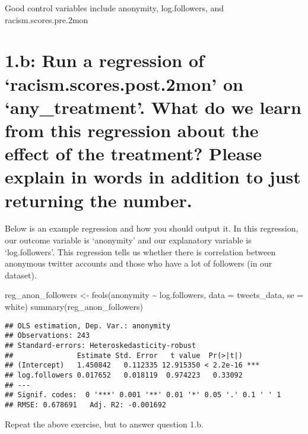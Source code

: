 \documentclass[
]{article}
\newenvironment{Shaded}{\begin{snugshade}}{\end{snugshade}}
\newcommand{\AttributeTok}[1]{\textcolor[rgb]{0.77,0.63,0.00}{#1}}
\newcommand{\FunctionTok}[1]{\textcolor[rgb]{0.00,0.00,0.00}{#1}}
\newcommand{\NormalTok}[1]{#1}
\newcommand{\OtherTok}[1]{\textcolor[rgb]{0.56,0.35,0.01}{#1}}
\newcommand{\SpecialCharTok}[1]{\textcolor[rgb]{0.00,0.00,0.00}{#1}}
\newcommand{\StringTok}[1]{\textcolor[rgb]{0.31,0.60,0.02}{#1}}
\begin{document}
Good control variables include anonymity, log.followers, and
racism.scores.pre.2mon

\hypertarget{b-run-a-regression-of-racism.scores.post.2mon-on-any_treatment.-what-do-we-learn-from-this-regression-about-the-effect-of-the-treatment-please-explain-in-words-in-addition-to-just-returning-the-number.}{%
\section{1.b: Run a regression of `racism.scores.post.2mon' on
`any\_treatment'. What do we learn from this regression about the effect
of the treatment? Please explain in words in addition to just returning
the
number.}\label{b-run-a-regression-of-racism.scores.post.2mon-on-any_treatment.-what-do-we-learn-from-this-regression-about-the-effect-of-the-treatment-please-explain-in-words-in-addition-to-just-returning-the-number.}}

Below is an example regression and how you should output it. In this
regression, our outcome variable is `anonymity' and our explanatory
variable is `log.followers'. This regression tells us whether there is
correlation between anonymous twitter accounts and those who have a lot
of followers (in our dataset).

\begin{Shaded}
\begin{Highlighting}[]
\NormalTok{reg\_anon\_followers }\OtherTok{\textless{}{-}} \FunctionTok{feols}\NormalTok{(anonymity }\SpecialCharTok{\textasciitilde{}}\NormalTok{ log.followers, }\AttributeTok{data =}\NormalTok{ tweets\_data, }\AttributeTok{se =} \StringTok{\textquotesingle{}white\textquotesingle{}}\NormalTok{)}
\FunctionTok{summary}\NormalTok{(reg\_anon\_followers)}
\end{Highlighting}
\end{Shaded}

\begin{verbatim}
## OLS estimation, Dep. Var.: anonymity
## Observations: 243 
## Standard-errors: Heteroskedasticity-robust 
##               Estimate Std. Error   t value  Pr(>|t|)    
## (Intercept)   1.450842   0.112335 12.915350 < 2.2e-16 ***
## log.followers 0.017652   0.018119  0.974223   0.33092    
## ---
## Signif. codes:  0 '***' 0.001 '**' 0.01 '*' 0.05 '.' 0.1 ' ' 1
## RMSE: 0.678691   Adj. R2: -0.001692
\end{verbatim}

Repeat the above exercise, but to answer question 1.b.
\end{document}
